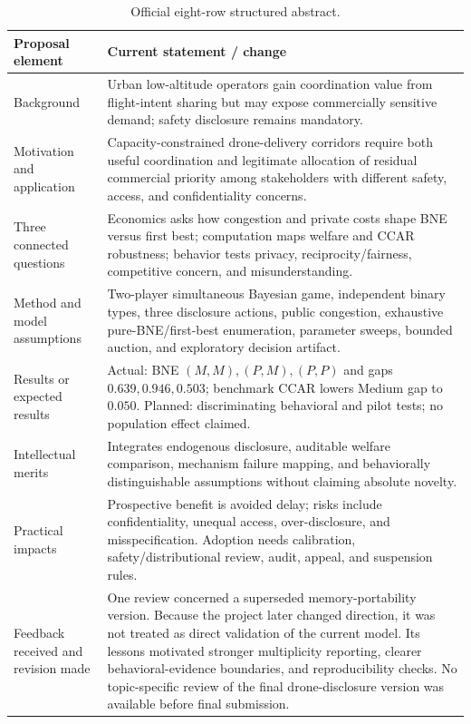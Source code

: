 \begin{table}[H]
\caption{Official eight-row structured abstract.}
\label{tab:abstract-map}
\renewcommand{\arraystretch}{1.16}
\begin{tabularx}{\textwidth}{@{}p{}Y@{}}\toprule
\textbf{Proposal element} & \textbf{Current statement / change} \\\midrule
Background & Urban low-altitude operators gain coordination value from flight-intent sharing but may expose commercially sensitive demand; safety disclosure remains mandatory. \\
Motivation and application & Capacity-constrained drone-delivery corridors require both useful coordination and legitimate allocation of residual commercial priority among stakeholders with different safety, access, and confidentiality concerns. \\
Three connected questions & Economics asks how congestion and private costs shape BNE versus first best; computation maps welfare and CCAR robustness; behavior tests privacy, reciprocity/fairness, competitive concern, and misunderstanding. \\
Method and model assumptions & Two-player simultaneous Bayesian game, independent binary types, three disclosure actions, public congestion, exhaustive pure-BNE/first-best enumeration, parameter sweeps, bounded auction, and exploratory decision artifact. \\
Results or expected results & Actual: BNE $(M,M),(P,M),(P,P)$ and gaps $0.639,0.946,0.503$; benchmark CCAR lowers Medium gap to $0.050$. Planned: discriminating behavioral and pilot tests; no population effect claimed. \\
Intellectual merits & Integrates endogenous disclosure, auditable welfare comparison, mechanism failure mapping, and behaviorally distinguishable assumptions without claiming absolute novelty. \\
Practical impacts & Prospective benefit is avoided delay; risks include confidentiality, unequal access, over-disclosure, and misspecification. Adoption needs calibration, safety/distributional review, audit, appeal, and suspension rules. \\
Feedback received and revision made & One review concerned a superseded memory-portability version. Because the project later changed direction, it was not treated as direct validation of the current model. Its lessons motivated stronger multiplicity reporting, clearer behavioral-evidence boundaries, and reproducibility checks. No topic-specific review of the final drone-disclosure version was available before final submission. \\
\bottomrule\end{tabularx}
\end{table}

